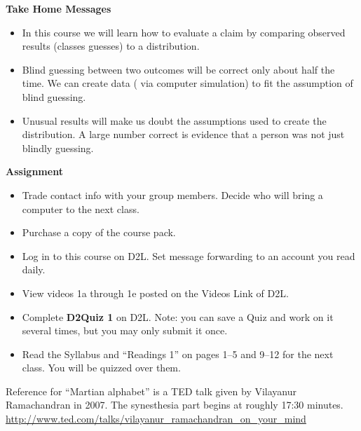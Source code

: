 \begin{center}
  {\bf Take Home Messages}
\end{center}
  \begin{itemize}
  \item In this course we will learn how to evaluate a claim by
    comparing observed results (classes guesses) to a distribution.

  \item Blind guessing between two outcomes will be correct only
    about half the time. We can create data ( via computer simulation)
    to fit the assumption of blind guessing.

  \item Unusual results will make us doubt the assumptions used to
    create the distribution.  A large number correct is evidence that
    a person was not just blindly guessing.
  \end{itemize} \vspace{.4in}

{\bf Assignment}
\begin{itemize}
\item  Trade contact info with your group members.  Decide who will
  bring a computer to the next class.
\item   Purchase a copy of the course pack.
\item   Log in to this course on D2L. Set message forwarding to an
  account you read daily.
\item View videos 1a through 1e posted on the Videos Link of D2L.
\item  Complete {\bf D2Quiz 1} on D2L.  Note: you can save a Quiz and
  work on it several times, but you may only submit it once. %
\item Read the Syllabus and ``Readings 1'' on pages 1--5 and 9--12 for
  the next class. You will be quizzed over them. 
\end{itemize}


Reference for ``Martian alphabet'' is a TED talk given by Vilayanur
Ramachandran in 2007. The synesthesia part begins at roughly 17:30 minutes.
\url{http://www.ted.com/talks/vilayanur_ramachandran_on_your_mind}